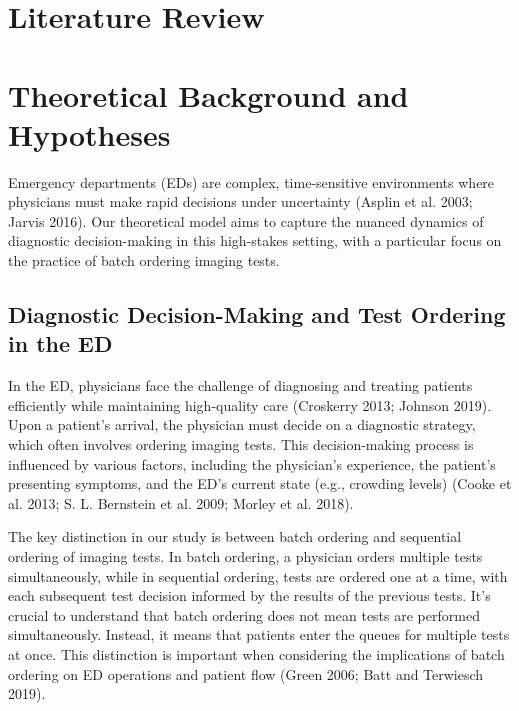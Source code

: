 \documentclass{article}
\begin{document}
\hypertarget{literature-review}{%
\section{Literature Review}\label{literature-review}}

\hypertarget{theoretical-background-and-hypotheses}{%
\section{Theoretical Background and
Hypotheses}\label{theoretical-background-and-hypotheses}}

Emergency departments (EDs) are complex, time-sensitive environments
where physicians must make rapid decisions under uncertainty (Asplin et
al. 2003; Jarvis 2016). Our theoretical model aims to capture the
nuanced dynamics of diagnostic decision-making in this high-stakes
setting, with a particular focus on the practice of batch ordering
imaging tests.

\hypertarget{diagnostic-decision-making-and-test-ordering-in-the-ed}{%
\subsection{Diagnostic Decision-Making and Test Ordering in the
ED}\label{diagnostic-decision-making-and-test-ordering-in-the-ed}}

In the ED, physicians face the challenge of diagnosing and treating
patients efficiently while maintaining high-quality care (Croskerry
2013; Johnson 2019). Upon a patient's arrival, the physician must decide
on a diagnostic strategy, which often involves ordering imaging tests.
This decision-making process is influenced by various factors, including
the physician's experience, the patient's presenting symptoms, and the
ED's current state (e.g., crowding levels) (Cooke et al. 2013; S. L.
Bernstein et al. 2009; Morley et al. 2018).

The key distinction in our study is between batch ordering and
sequential ordering of imaging tests. In batch ordering, a physician
orders multiple tests simultaneously, while in sequential ordering,
tests are ordered one at a time, with each subsequent test decision
informed by the results of the previous tests. It's crucial to
understand that batch ordering does not mean tests are performed
simultaneously. Instead, it means that patients enter the queues for
multiple tests at once. This distinction is important when considering
the implications of batch ordering on ED operations and patient flow
(Green 2006; Batt and Terwiesch 2019).
\end{document}
